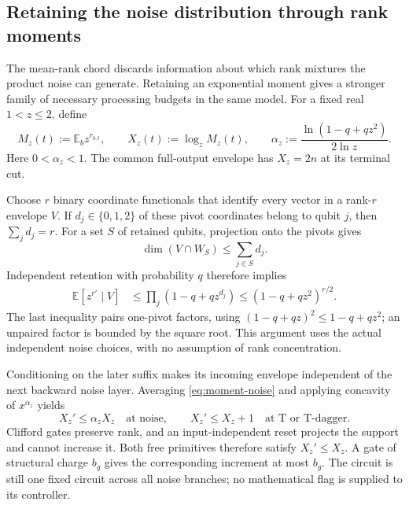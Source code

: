 \documentclass[11pt,a4paper]{article}
\numberwithin{equation}{section}
\theoremstyle{remark}\newtheorem*{remark}{Interpretation}
\newcommand{\E}{\mathbb E}
\begin{document}
\subsection{Retaining the noise distribution through rank moments}
The mean-rank chord discards information about which rank mixtures the product noise can generate. Retaining an exponential moment gives a stronger family of necessary processing budgets in the same model. For a fixed real $1<z\le2$, define
\begin{equation}
M_z(t):=\E_b z^{r_{b,t}},\qquad
X_z(t):=\log_z M_z(t),\qquad
\alpha_z:=\frac{\ln(1-q+qz^2)}{2\ln z}.
\label{eq:moment-potential}
\end{equation}
Here $0<\alpha_z<1$. The common full-output envelope has $X_z=2n$ at its terminal cut.

Choose $r$ binary coordinate functionals that identify every vector in a rank-$r$ envelope $V$. If $d_j\in\{0,1,2\}$ of these pivot coordinates belong to qubit $j$, then $\sum_jd_j=r$. For a set $S$ of retained qubits, projection onto the pivots gives
\[
\dim(V\cap W_S)\le\sum_{j\in S}d_j.
\]
Independent retention with probability $q$ therefore implies
\begin{align}
\E[z^{r'}\mid V]
&\le\prod_j(1-q+qz^{d_j})
\le(1-q+qz^2)^{r/2}.
\label{eq:moment-noise}
\end{align}
The last inequality pairs one-pivot factors, using
$(1-q+qz)^2\le1-q+qz^2$; an unpaired factor is bounded by the square root. This argument uses the actual independent noise choices, with no assumption of rank concentration.

Conditioning on the later suffix makes its incoming envelope independent of the next backward noise layer. Averaging \eqref{eq:moment-noise} and applying concavity of $x^{\alpha_z}$ yields
\begin{equation}
X_z'\le\alpha_zX_z\quad\text{at noise},\qquad
X_z'\le X_z+1\quad\text{at T or T-dagger}.
\label{eq:moment-ledger}
\end{equation}
Clifford gates preserve rank, and an input-independent reset projects the support and cannot increase it. Both free primitives therefore satisfy $X_z'\le X_z$. A gate of structural charge $b_g$ gives the corresponding increment at most $b_g$. The circuit is still one fixed circuit across all noise branches; no mathematical flag is supplied to its controller.
\end{document}

